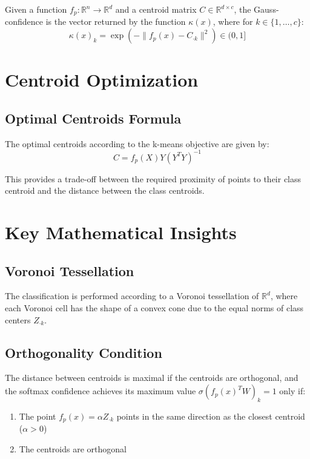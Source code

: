 \begin{definition}
Given a function $f_p : \mathbb{R}^n \rightarrow \mathbb{R}^d$ and a centroid matrix $C \in \mathbb{R}^{d \times c}$, the Gauss-confidence is the vector returned by the function $\kappa(x)$, where for $k \in \{1,\ldots,c\}$:
\begin{equation}
\kappa(x)_k = \exp(-\|f_p(x) - C_{\cdot k}\|^2) \in (0,1]
\end{equation}
\end{definition}

\section{Centroid Optimization}

\subsection{Optimal Centroids Formula}

The optimal centroids according to the k-means objective are given by:
\begin{equation}
C = f_p(X)Y(Y^T Y)^{-1}
\end{equation}

This provides a trade-off between the required proximity of points to their class centroid and the distance between the class centroids.

\section{Key Mathematical Insights}

\subsection{Voronoi Tessellation}

The classification is performed according to a Voronoi tessellation of $\mathbb{R}^d$, where each Voronoi cell has the shape of a convex cone due to the equal norms of class centers $Z_{\cdot k}$.

\subsection{Orthogonality Condition}

The distance between centroids is maximal if the centroids are orthogonal, and the softmax confidence achieves its maximum value $\sigma(f_p(x)^T W)_k = 1$ only if:
\begin{enumerate}
\item The point $f_p(x) = \alpha Z_{\cdot k}$ points in the same direction as the closest centroid ($\alpha > 0$)
\item The centroids are orthogonal
\end{enumerate}

